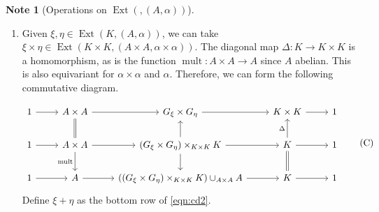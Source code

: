 \documentclass[10pt,letterpaper,cm]{nupset}
\theoremstyle{definition}
\newtheorem{note}[definition]{Note}
\theoremstyle{theorem}
\theoremstyle{remark}
\newcommand{\1}{\mathbf{1}}
\newcommand{\0}{\vec 0}
\DeclareMathOperator{\mult}{mult}
\DeclareMathOperator{\ext}{Ext}
\begin{document}
\begin{note}[Operations on $\ext(, (A, \alpha))$]
\begin{enumerate}[label=(\arabic*)]
\begin{proof}
Finally, observe that 
\begin{align*}
\ker(G\ltimes_{\beta \circ q} B \twoheadrightarrow K) & = \left\{(g, b) : q(g) =e\right\} 
\\ & = \left\{(g, b) : g \in A\right\}
\\ &  \geq A\times \{e\} \cong A.\end{align*}
\end{proof}
Now, let $G_{\psi_{\ast}\xi}$ denote $G \cup_A B$, which equals $\faktor{G\ltimes_{\beta \circ q} B}{(i\times \psi)(A)}.$ 
We have obtained the commutative diagram.
\[ \label{eqn:cd}
\begin{tikzcd}
1 \arrow[r] & A \arrow[d, hook] \arrow[r] & G \arrow[d, hook] \arrow[r] & K \arrow[d, equal] \arrow[r] & 1 \\
1 \arrow[r] & A\times B \arrow[r, "i"] \arrow[d, two heads] & G \ltimes_{\beta \circ q} B \arrow[r, "q"] \arrow[d, two heads] & K \arrow[r] \arrow[d, equal] & 1 \\
1 \arrow[r] & \underbrace{B}_{\faktor{A\times B}{(i\times \psi)(A)}} \arrow[r] & G_{\psi_{\ast}\xi} \arrow[r] & K \arrow[r] & 1
\end{tikzcd}, \tag{B}
\]
where $B \cong \faktor{A\times B}{(i\times \psi)(A)}$ via the mapping $b \mapsto \left[(e, b)\right]$. 

Let $\psi_{\ast}$ denote the induced map $G \to G_{\psi_{\ast} \xi}$. Define the extension $\psi_{\ast}\xi$ as the bottom row of \eqref{eqn:cd}.

\item Given $\xi, \eta \in \ext(K, (A, \alpha))$, we can take $\xi \times \eta \in \ext(K \times K, (A\times A, \alpha \times \alpha))$. The diagonal map $\Delta : K \to K \times K$ is a homomorphism, as is the function $\mult: A \times A \to A$ since $A$ abelian. This is also equivariant for $\alpha \times \alpha$ and $\alpha$.
Therefore, we can form the following commutative diagram.

\[ \label{eqn:cd2}
\begin{tikzcd}
1 \arrow[r] & A\times A \arrow[r] & G_{\xi}\times G_{\eta} \arrow[r] & K\times K \arrow[r] & 1 \\
1 \arrow[r] & A\times A \arrow[r] \arrow[d, "\mult"'] \arrow[u, equal] & \left(G_{\xi} \times G_{\eta}\right) \times_{K\times K} K \arrow[r] \arrow[u] \arrow[d] & K \arrow[r] \arrow[u, "\Delta"] \arrow[d, equal] & 1 \\
1 \arrow[r] & A \arrow[r] & \left(\left(G_{\xi} \times G_{\eta}\right) \times_{K\times K} K\right) \cup_{A\times A} A \arrow[r] & K \arrow[r] & 1
\end{tikzcd} \tag{C}
\]
Define $\xi + \eta$ as the bottom row of \eqref{eqn:cd2}.
\end{enumerate}
\end{note}
\end{document}
